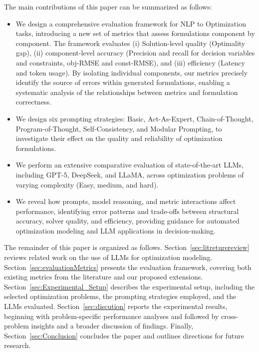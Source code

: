 \documentclass[review,12pt]{elsarticle}
\begin{document}
The main contributions of this paper can be summarized as follows:  
\vspace{-2mm}
\begin{itemize}
\vspace{-1mm}
    \item We design a comprehensive evaluation framework for NLP to Optimization tasks, introducing a new set of metrics that assess formulations component by component. The framework evaluates (i) Solution-level quality (Optimality gap), (ii) component-level accuracy (Precision and recall for decision variables and constraints, obj-RMSE and const-RMSE), and (iii) efficiency (Latency and token usage). By isolating individual components, our metrics precisely identify the source of errors within generated formulations, enabling a systematic analysis of the relationships between metrics and formulation correctness.  
\vspace{-3mm}
    \item We design six prompting strategies: Basic, Act-As-Expert, Chain-of-Thought, Program-of-Thought, Self-Consistency, and Modular Prompting, to investigate their effect on the quality and reliability of optimization formulations.  
\vspace{-3mm}
    \item We perform an extensive comparative evaluation of state-of-the-art LLMs, including GPT-5, DeepSeek, and LLaMA, across optimization problems of varying complexity (Easy, medium, and hard).  
\vspace{-3mm}
    \item We reveal how prompts, model reasoning, and metric interactions affect performance, identifying error patterns and trade-offs between structural accuracy, solver quality, and efficiency, providing guidance for automated optimization modeling and LLM applications in decision-making.
\end{itemize}
\vspace{-2mm}

The remainder of this paper is organized as follows. Section~\ref{sec:litreturereview} reviews related work on the use of LLMs for optimization modeling. Section~\ref{sec:evaluationMetrics} presents the evaluation framework, covering both existing metrics from the literature and our proposed extensions. Section~\ref{sec:Experimental_Setup} describes the experimental setup, including the selected optimization problems, the prompting strategies employed, and the LLMs evaluated. Section~\ref{sec:discution} reports the experimental results, beginning with problem-specific performance analyses and followed by cross-problem insights and a broader discussion of findings. Finally, Section~\ref{sec:Conclusion} concludes the paper and outlines directions for future research.  
\end{document}
